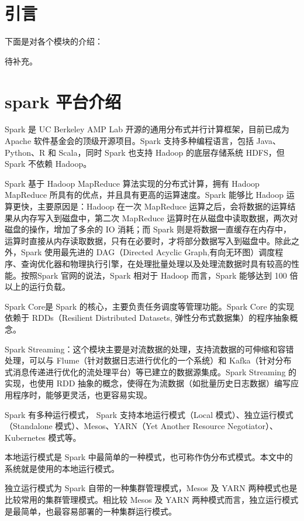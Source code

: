 \section{引言}
下面是对各个模块的介绍：

待补充。

\section{spark 平台介绍}
Spark 是 UC Berkeley AMP Lab 开源的通用分布式并行计算框架，目前已成为 Apache 软件基金会的顶级开源项目。Spark 支持多种编程语言，包括 Java、Python、R 和 Scala，同时 Spark 也支持 Hadoop 的底层存储系统 HDFS，但 Spark 不依赖 Hadoop。

Spark 基于 Hadoop MapReduce 算法实现的分布式计算，拥有 Hadoop MapReduce 所具有的优点，并且具有更高的运算速度。Spark 能够比 Hadoop 运算更快，主要原因是：Hadoop 在一次 MapReduce 运算之后，会将数据的运算结果从内存写入到磁盘中，第二次 MapReduce 运算时在从磁盘中读取数据，两次对磁盘的操作，增加了多余的 IO 消耗；而 Spark 则是将数据一直缓存在内存中，运算时直接从内存读取数据，只有在必要时，才将部分数据写入到磁盘中。除此之外，Spark 使用最先进的 DAG（Directed Acyclic Graph,有向无环图）调度程序、查询优化器和物理执行引擎，在处理批量处理以及处理流数据时具有较高的性能。按照Spark 官网的说法，Spark 相对于 Hadoop 而言，Spark 能够达到 100 倍以上的运行负载。

Spark Core是 Spark 的核心，主要负责任务调度等管理功能。Spark
Core 的实现依赖于 RDDs（Resilient Distributed Datasets,
弹性分布式数据集）的程序抽象概念。

Spark Streaming：这个模块主要是对流数据的处理，支持流数据的可伸缩和容错处理，可以与 Flume（针对数据日志进行优化的一个系统）和 Kafka（针对分布式消息传递进行优化的流处理平台）等已建立的数据源集成。Spark Streaming 的实现，也使用 RDD 抽象的概念，使得在为流数据（如批量历史日志数据）编写应用程序时，能够更灵活，也更容易实现。

Spark 有多种运行模式， Spark 支持本地运行模式（Local 模式）、独立运行模式（Standalone 模式）、Mesos、YARN（Yet Another Resource Negotiator）、Kubernetes 模式等。

本地运行模式是 Spark 中最简单的一种模式，也可称作伪分布式模式。本文中的系统就是使用的本地运行模式。

独立运行模式为 Spark 自带的一种集群管理模式，Mesos 及 YARN 两种模式也是比较常用的集群管理模式。相比较 Mesos 及 YARN 两种模式而言，独立运行模式是最简单，也最容易部署的一种集群运行模式。


